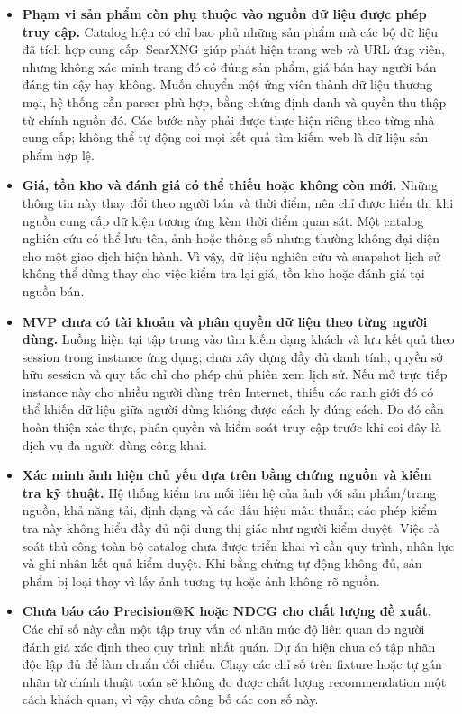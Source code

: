 \begin{itemize}
  \item \textbf{Phạm vi sản phẩm còn phụ thuộc vào nguồn dữ liệu được phép truy cập.} Catalog hiện có chỉ bao phủ những sản phẩm mà các bộ dữ liệu đã tích hợp cung cấp. SearXNG giúp phát hiện trang web và URL ứng viên, nhưng không xác minh trang đó có đúng sản phẩm, giá bán hay người bán đáng tin cậy hay không. Muốn chuyển một ứng viên thành dữ liệu thương mại, hệ thống cần parser phù hợp, bằng chứng định danh và quyền thu thập từ chính nguồn đó. Các bước này phải được thực hiện riêng theo từng nhà cung cấp; không thể tự động coi mọi kết quả tìm kiếm web là dữ liệu sản phẩm hợp lệ.

  \item \textbf{Giá, tồn kho và đánh giá có thể thiếu hoặc không còn mới.} Những thông tin này thay đổi theo người bán và thời điểm, nên chỉ được hiển thị khi nguồn cung cấp dữ kiện tương ứng kèm thời điểm quan sát. Một catalog nghiên cứu có thể lưu tên, ảnh hoặc thông số nhưng thường không đại diện cho một giao dịch hiện hành. Vì vậy, dữ liệu nghiên cứu và snapshot lịch sử không thể dùng thay cho việc kiểm tra lại giá, tồn kho hoặc đánh giá tại nguồn bán.

  \item \textbf{MVP chưa có tài khoản và phân quyền dữ liệu theo từng người dùng.} Luồng hiện tại tập trung vào tìm kiếm dạng khách và lưu kết quả theo session trong instance ứng dụng; chưa xây dựng đầy đủ danh tính, quyền sở hữu session và quy tắc chỉ cho phép chủ phiên xem lịch sử. Nếu mở trực tiếp instance này cho nhiều người dùng trên Internet, thiếu các ranh giới đó có thể khiến dữ liệu giữa người dùng không được cách ly đúng cách. Do đó cần hoàn thiện xác thực, phân quyền và kiểm soát truy cập trước khi coi đây là dịch vụ đa người dùng công khai.

  \item \textbf{Xác minh ảnh hiện chủ yếu dựa trên bằng chứng nguồn và kiểm tra kỹ thuật.} Hệ thống kiểm tra mối liên hệ của ảnh với sản phẩm/trang nguồn, khả năng tải, định dạng và các dấu hiệu mâu thuẫn; các phép kiểm tra này không hiểu đầy đủ nội dung thị giác như người kiểm duyệt. Việc rà soát thủ công toàn bộ catalog chưa được triển khai vì cần quy trình, nhân lực và ghi nhận kết quả kiểm duyệt. Khi bằng chứng tự động không đủ, sản phẩm bị loại thay vì lấy ảnh tương tự hoặc ảnh không rõ nguồn.

  \item \textbf{Chưa báo cáo Precision@K hoặc NDCG cho chất lượng đề xuất.} Các chỉ số này cần một tập truy vấn có nhãn mức độ liên quan do người đánh giá xác định theo quy trình nhất quán. Dự án hiện chưa có tập nhãn độc lập đủ để làm chuẩn đối chiếu. Chạy các chỉ số trên fixture hoặc tự gán nhãn từ chính thuật toán sẽ không đo được chất lượng recommendation một cách khách quan, vì vậy chưa công bố các con số này.


\end{itemize}
